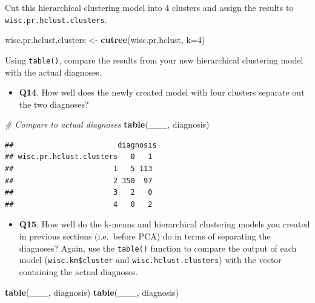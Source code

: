 \documentclass[]{article}
\newenvironment{Shaded}{\begin{snugshade}}{\end{snugshade}}
\newcommand{\KeywordTok}[1]{\textcolor[rgb]{0.13,0.29,0.53}{\textbf{#1}}}
\newcommand{\DataTypeTok}[1]{\textcolor[rgb]{0.13,0.29,0.53}{#1}}
\newcommand{\DecValTok}[1]{\textcolor[rgb]{0.00,0.00,0.81}{#1}}
\newcommand{\StringTok}[1]{\textcolor[rgb]{0.31,0.60,0.02}{#1}}
\newcommand{\CommentTok}[1]{\textcolor[rgb]{0.56,0.35,0.01}{\textit{#1}}}
\newcommand{\NormalTok}[1]{#1}
\providecommand{\tightlist}{%
  \setlength{\itemsep}{0pt}\setlength{\parskip}{0pt}}
\begin{document}
Cut this hierarchical clustering model into 4 clusters and assign the
results to \texttt{wisc.pr.hclust.clusters}.

\begin{Shaded}
\begin{Highlighting}[]
\NormalTok{wisc.pr.hclust.clusters <-}\StringTok{ }\KeywordTok{cutree}\NormalTok{(wisc.pr.hclust, }\DataTypeTok{k=}\DecValTok{4}\NormalTok{)}
\end{Highlighting}
\end{Shaded}

Using \texttt{table()}, compare the results from your new hierarchical
clustering model with the actual diagnoses.

\begin{itemize}
\tightlist
\item
  \textbf{Q14}. How well does the newly created model with four clusters
  separate out the two diagnoses?
\end{itemize}

\begin{Shaded}
\begin{Highlighting}[]
\CommentTok{# Compare to actual diagnoses}
\KeywordTok{table}\NormalTok{(___, diagnosis)}
\end{Highlighting}
\end{Shaded}

\begin{verbatim}
##                        diagnosis
## wisc.pr.hclust.clusters   0   1
##                       1   5 113
##                       2 350  97
##                       3   2   0
##                       4   0   2
\end{verbatim}

\begin{itemize}
\tightlist
\item
  \textbf{Q15}. How well do the k-means and hierarchical clustering
  models you created in previous sections (i.e.~before PCA) do in terms
  of separating the diagnoses? Again, use the \texttt{table()} function
  to compare the output of each model (\texttt{wisc.km\$cluster} and
  \texttt{wisc.hclust.clusters}) with the vector containing the actual
  diagnoses.
\end{itemize}

\begin{Shaded}
\begin{Highlighting}[]
\KeywordTok{table}\NormalTok{(___, diagnosis)}
\KeywordTok{table}\NormalTok{(___, diagnosis)}
\end{Highlighting}
\end{Shaded}
\end{document}
